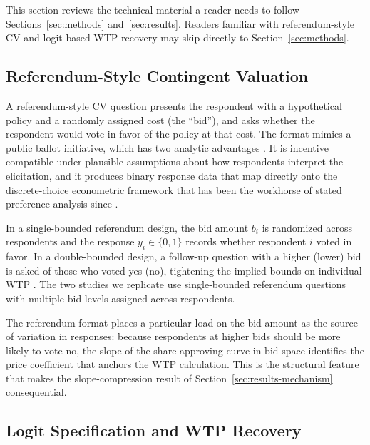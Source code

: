 \documentclass[12pt]{article}
\begin{document}
This section reviews the technical material a reader needs to follow Sections~\ref{sec:methods} and~\ref{sec:results}. Readers familiar with referendum-style CV and logit-based WTP recovery may skip directly to Section~\ref{sec:methods}.

\subsection{Referendum-Style Contingent Valuation}\label{sec:bg-cv}

A referendum-style CV question presents the respondent with a hypothetical policy and a randomly assigned cost (the ``bid''), and asks whether the respondent would vote in favor of the policy at that cost. The format mimics a public ballot initiative, which has two analytic advantages \parencite{Carson2007}. It is incentive compatible under plausible assumptions about how respondents interpret the elicitation, and it produces binary response data that map directly onto the discrete-choice econometric framework that has been the workhorse of stated preference analysis since \textcite{Hanemann1984}.

In a single-bounded referendum design, the bid amount $b_i$ is randomized across respondents and the response $y_i \in \{0, 1\}$ records whether respondent $i$ voted in favor. In a double-bounded design, a follow-up question with a higher (lower) bid is asked of those who voted yes (no), tightening the implied bounds on individual WTP \parencite{Hanemann1991}. The two studies we replicate use single-bounded referendum questions with multiple bid levels assigned across respondents.

The referendum format places a particular load on the bid amount as the source of variation in responses: because respondents at higher bids should be more likely to vote no, the slope of the share-approving curve in bid space identifies the price coefficient that anchors the WTP calculation. This is the structural feature that makes the slope-compression result of Section~\ref{sec:results-mechanism} consequential.

\subsection{Logit Specification and WTP Recovery}\label{sec:bg-logit}
\end{document}
